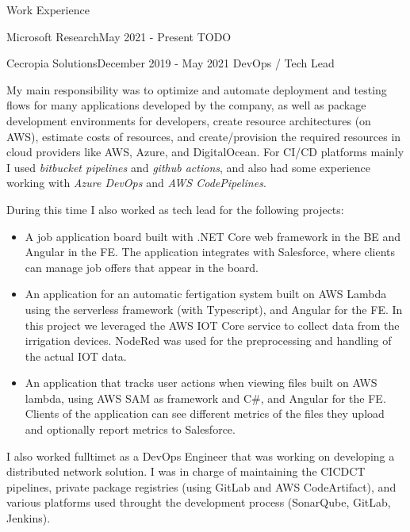 \documentclass{resume} %
\begin{document}
\begin{rSection}{Work Experience}

\begin{rSubsection}{Microsoft Research}{May 2021 - Present}
TODO
\end{rSubsection}

\begin{rSubsection}{Cecropia Solutions}{December 2019 - May 2021}
{DevOps / Tech Lead}{}
\item[] My main responsibility was to optimize and automate deployment and testing flows for many applications developed by the company, as well as package development environments for developers, create resource architectures (on AWS), estimate costs of resources, and create/provision the required resources in cloud providers like AWS, Azure, and DigitalOcean. For CI/CD platforms mainly I used \textit{bitbucket pipelines} and \textit{github actions}, and also had some experience working with \textit{Azure DevOps} and \textit{AWS CodePipelines}. 

During this time I also worked as tech lead for the following projects: 

\begin{itemize}
    \item A job application board built with .NET Core web framework in the BE and Angular in the FE. The application integrates with Salesforce, where clients can manage job offers that appear in the board. 
    \item An application for an automatic fertigation system built on AWS Lambda using the serverless framework (with Typescript), and Angular for the FE. In this project we leveraged the AWS IOT Core service to collect data from the irrigation devices. NodeRed was used for the preprocessing and handling of the actual IOT data.
    \item An application that tracks user actions when viewing files built on AWS lambda, using AWS SAM as framework and C\#, and Angular for the FE. Clients of the application can see different metrics of the files they upload and optionally report metrics to Salesforce. 
\end{itemize}

I also worked fulltimet as a DevOps Engineer that was working on developing a distributed network solution. I was in charge of maintaining the CICDCT pipelines, private package registries (using GitLab and AWS CodeArtifact), and various platforms used throught the development process (SonarQube, GitLab, Jenkins). 


\end{rSubsection}
\end{rSection}
\end{document}
